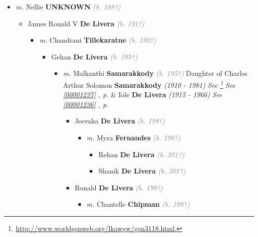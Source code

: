 \documentclass[10pt, openany]{book}
\begin{document}
\begin{itemize}
{\begin{itemize}
{\begin{itemize}
\item{\textit{m.} Nellie \textbf{UNKNOWN} \textcolor{gray}{\textit{(b. 188?)}}   \label{couple:00001207:00002274} \begin{itemize}
\item{James Ronald V \textbf{De Livera} \textcolor{gray}{\textit{(b. 191?)}}
\begin{itemize}
\item{\textit{m.} Chandrani \textbf{Tillekaratne} \textcolor{gray}{\textit{(b. 192?)}}   \label{couple:00002281:00002282} \begin{itemize}
\item{Gehan \textbf{De Livera} \textcolor{gray}{\textit{(b. 195?)}}
\begin{itemize}
\item{\textit{m.} Malkanthi \textbf{Samarakkody} \textcolor{gray}{\textit{(b. 195?)}} Daughter of  Charles Arthur Solomon \textbf{Samarakkody} \textcolor{slorange}{\textit{(1910 - 1981)}} \textcolor{slmaroon}{\textit{See \footnote{\url{http://www.worldgenweb.org/lkawgw/gen3118.html.}}}} \textcolor{slteal}{\textit{See  \autoref{00001237} \textit{, p. \pageref{00001237} }}}  \&  Iole \textbf{De Livera} \textcolor{slorange}{\textit{(1915 - 1966)}} \textcolor{slteal}{\textit{See  \autoref{00001236} \textit{, p. \pageref{00001236} }}}   \label{couple:00001210:00001211} \begin{itemize}
\item{Jeevaka \textbf{De Livera} \textcolor{gray}{\textit{(b. 198?)}}
\begin{itemize}
\item{\textit{m.} Myra \textbf{Fernandes} \textcolor{gray}{\textit{(b. 198?)}}   \label{couple:00001212:00002275} \begin{itemize}
\item{Rehan \textbf{De Livera} \textcolor{gray}{\textit{(b. 201?)}}
  }
\item{Shanik \textbf{De Livera} \textcolor{gray}{\textit{(b. 201?)}}
  }
\end{itemize}}
\end{itemize}
  }
\item{Ronald \textbf{De Livera} \textcolor{gray}{\textit{(b. 198?)}}
\begin{itemize}
\item{\textit{m.} Chantelle \textbf{Chipman} \textcolor{gray}{\textit{(b. 198?)}}   \label{couple:00001213:00002278} \begin{itemize}

\end{itemize}}
\end{itemize}}
\end{itemize}}
\end{itemize}}
\end{itemize}}
\end{itemize}}
\end{itemize}}
\end{itemize}}
\end{itemize}}
\end{itemize}
\end{document}
